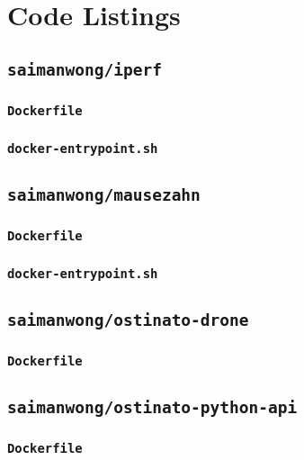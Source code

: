 \chapter{Code Listings}

\section{\texttt{saimanwong/iperf}} \label{code:iperf}
\subsection{\texttt{Dockerfile}}

\subsection{\texttt{docker-entrypoint.sh}}


\clearpage
\section{\texttt{saimanwong/mausezahn}}\label{code:mausezahn}
\subsection{\texttt{Dockerfile}}

\clearpage
\subsection{\texttt{docker-entrypoint.sh}}


\clearpage
\section{\texttt{saimanwong/ostinato-drone}}\label{code:ostinato-drone}
\subsection{\texttt{Dockerfile}}


\clearpage
\section{\texttt{saimanwong/ostinato-python-api}}\label{code:ostinato-python-api}
\subsection{\texttt{Dockerfile}}

